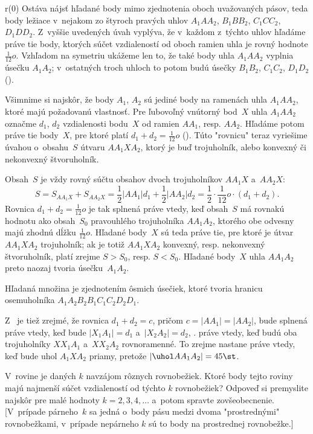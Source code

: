 {\smallskip
\inspicture r(0)
Ostáva nájsť hľadané body mimo zjednotenia oboch uvažovaných pásov,
teda body ležiace v~nejakom zo štyroch
pravých uhlov $A_1AA_2$, $B_1BB_2$, $C_1CC_2$, $D_1DD_2$.
Z~vyššie uvedených úvah vyplýva, že v~každom z~týchto uhlov hľadáme
práve tie body, ktorých súčet vzdialeností
od oboch ramien uhla je rovný hodnote $\frac1{12}o$. Vzhľadom na
symetriu ukážeme len to, že také body uhla $A_1AA_2$
vyplnia úsečku $A_1A_2$; v~ostatných troch uhloch to potom budú
úsečky $B_1B_2$, $C_1C_2$, $D_1D_2$ ().

Všimnime si najskôr, že body $A_1$, $A_2$ sú jediné body
na ramenách uhla $A_1AA_2$, ktoré majú požadovanú vlastnosť.
Pre ľubovoľný vnútorný bod~$X$ uhla $A_1AA_2$ označme
$d_1$, $d_2$ vzdialenosti bodu~$X$ od ramien $AA_1$, resp.
$AA_2$. Hľadáme potom
práve tie body~$X$, pre ktoré platí $d_1+d_2=\frac1{12}o$ (\obr).
Túto "rovnicu" teraz vyriešime úvahou
o~obsahu~$S$ útvaru $AA_1XA_2$, ktorý je buď trojuholník, alebo konvexný či
nekonvexný štvoruholník.

Obsah~$S$ je vždy rovný súčtu obsahov
dvoch trojuholníkov $AA_1X$ a~$AA_2X$:
$$
S=S_{AA_1X}+S_{AA_2X}=\frac12|AA_1|d_1+\frac12|AA_2|d_2=
\frac12\cdot\frac1{12}o\cdot(d_1+d_2).
$$
Rovnica $d_1+d_2=\frac1{12}o$ je tak splnená práve vtedy, keď obsah~$S$
má rovnakú hodnotu ako obsah~$S_0$ pravouhlého trojuholníka $AA_1A_2$, ktorého
obe odvesny majú zhodnú dĺžku $\frac1{12}o$.
Hľadané body~$X$ sú teda práve tie, pre ktoré je útvar
$AA_1XA_2$ trojuholník; ak je totiž $AA_1XA_2$ konvexný, resp. nekonvexný
štvoruholník, platí zrejme $S>S_0$, resp. $S<S_0$. Hľadané body~$X$
uhla $AA_1A_2$ preto naozaj tvoria úsečku~$A_1A_2$.

\odpoved
Hľadaná množina je zjednotením ôsmich úsečiek, ktoré
tvoria hranicu osemuholníka $A_1A_2B_2B_1C_1C_2D_2D_1$.

\poznamka
Z~ je tiež zrejmé, že rovnica $d_1+d_2=c$, pričom $c=|AA_1|=|AA_2|$,
bude splnená práve vtedy, keď bude $|X_1A_1|=d_1$ a~$|X_2A_2|=d_2$, \tj.
práve vtedy, keď budú oba trojuholníky $XX_1A_1$ a~$XX_2A_2$ rovnoramenné. To
zrejme nastane práve vtedy, keď bude uhol $A_1XA_2$ priamy, pretože $|\uhol AA_1A_2|=45\st$.

V~rovine je daných $k$ navzájom rôznych rovnobežiek. Ktoré body
tejto roviny majú najmenší súčet vzdialeností od týchto $k$
rovnobežiek? Odpoveď si premyslite najskôr pre malé hodnoty
$k=2, 3, 4,\dots$ a~potom spravte zovšeobecnenie. [V~prípade párneho~$k$
sa jedná o~body pásu medzi dvoma "prostrednými" rovnobežkami,
v~prípade nepárneho $k$ sú to body na prostrednej rovnobežke.]

}
